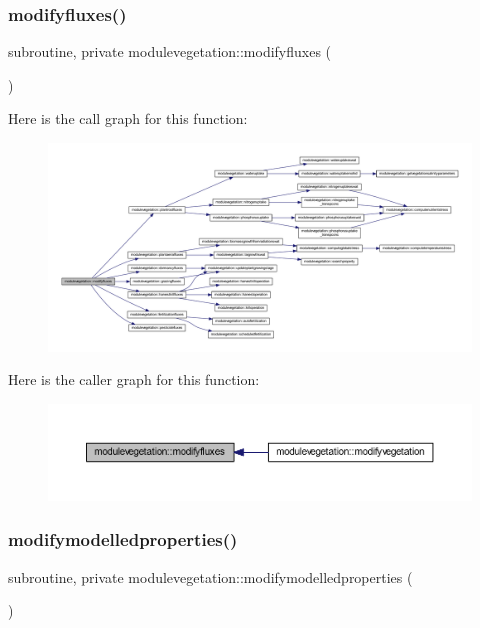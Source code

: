 \subsubsection{\texorpdfstring{modifyfluxes()}{modifyfluxes()}}
{\footnotesize\ttfamily subroutine, private modulevegetation\+::modifyfluxes (\begin{DoxyParamCaption}{ }\end{DoxyParamCaption})\hspace{0.3cm}{\ttfamily [private]}}

Here is the call graph for this function\+:\nopagebreak
\begin{figure}[H]
\begin{center}
\leavevmode
\includegraphics[width=350pt]{namespacemodulevegetation_aa3811c1a240a54342243a4e460197d77_cgraph}
\end{center}
\end{figure}
Here is the caller graph for this function\+:\nopagebreak
\begin{figure}[H]
\begin{center}
\leavevmode
\includegraphics[width=350pt]{namespacemodulevegetation_aa3811c1a240a54342243a4e460197d77_icgraph}
\end{center}
\end{figure}
\mbox{\label{namespacemodulevegetation_a5532e866feccedcf7ef4094cb3f08064}} 
\subsubsection{\texorpdfstring{modifymodelledproperties()}{modifymodelledproperties()}}
{\footnotesize\ttfamily subroutine, private modulevegetation\+::modifymodelledproperties (\begin{DoxyParamCaption}{ }\end{DoxyParamCaption})\hspace{0.3cm}{\ttfamily [private]}}

